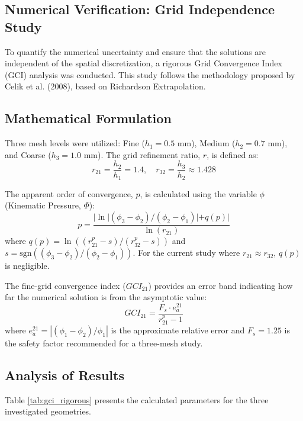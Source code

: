 \documentclass[12pt, a4paper]{article}
\begin{document}
\subsection{Numerical Verification: Grid Independence Study}

To quantify the numerical uncertainty and ensure that the solutions are independent of the spatial discretization, a rigorous Grid Convergence Index (GCI) \cite{roache1994} analysis was conducted. This study follows the methodology proposed by Celik et al. (2008), based on Richardson Extrapolation.

\subsection{Mathematical Formulation}
Three mesh levels were utilized: Fine ($h_1 = 0.5$ mm), Medium ($h_2 = 0.7$ mm), and Coarse ($h_3 = 1.0$ mm). The grid refinement ratio, $r$, is defined as:
\begin{equation}
	r_{21} = \frac{h_2}{h_1} = 1.4, \quad r_{32} = \frac{h_3}{h_2} \approx 1.428
\end{equation}

The apparent order of convergence, $p$, is calculated using the variable $\phi$ (Kinematic Pressure, $\Phi$):
\begin{equation}
	p = \frac{|\ln|(\phi_3 - \phi_2) / (\phi_2 - \phi_1)| + q(p)|}{\ln(r_{21})}
\end{equation}
where $q(p) = \ln((r_{21}^p - s) / (r_{32}^p - s))$ and $s = \text{sgn}((\phi_3 - \phi_2) / (\phi_2 - \phi_1))$. For the current study where $r_{21} \approx r_{32}$, $q(p)$ is negligible.

The fine-grid convergence index ($GCI_{21}$) provides an error band indicating how far the numerical solution is from the asymptotic value:
\begin{equation}
	GCI_{21} = \frac{F_s \cdot e_a^{21}}{r_{21}^p - 1}
\end{equation}
where $e_a^{21} = |(\phi_1 - \phi_2) / \phi_1|$ is the approximate relative error and $F_s = 1.25$ is the safety factor recommended for a three-mesh study.

\subsection{Analysis of Results}
Table \ref{tab:gci_rigorous} presents the calculated parameters for the three investigated geometries.
\end{document}

